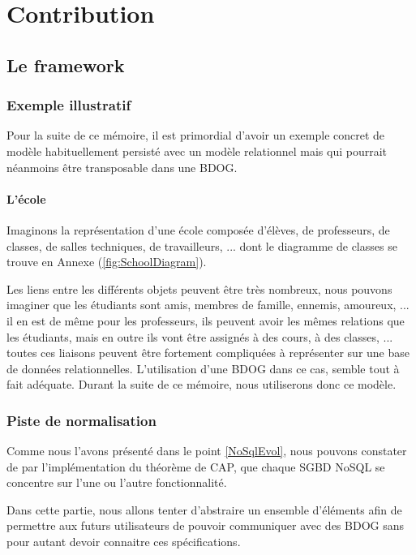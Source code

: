 \documentclass[a4paper,fleqn,12pt,oneside]{report}
\begin{document}
\part{Contribution}
\chapter{Le framework}
\section{Exemple illustratif}

Pour la suite de ce mémoire, il est primordial d'avoir un exemple concret de modèle habituellement persisté avec un modèle relationnel mais qui pourrait néanmoins être transposable dans une BDOG.

\subsection*{L'école}

Imaginons la représentation d'une école composée d'élèves, de professeurs, de classes, de salles techniques, de travailleurs, ... dont   le diagramme de classes se trouve en Annexe (\ref{fig:SchoolDiagram}).

Les liens entre les différents objets peuvent être très nombreux, nous pouvons imaginer que les étudiants sont amis, membres de famille, ennemis, amoureux, ... il en est de même pour les professeurs, ils peuvent avoir les mêmes relations que les étudiants, mais en outre ils vont être assignés à des cours, à des classes, ... toutes ces liaisons peuvent être fortement compliquées à représenter sur une base de données relationnelles. L’utilisation d’une BDOG dans ce cas, semble tout à fait adéquate. Durant la suite de ce mémoire, nous utiliserons donc ce modèle.



\section{Piste de normalisation} 
Comme nous l'avons présenté dans le point \ref{NoSqlEvol}, nous pouvons constater de par l'implémentation du théorème de CAP, que chaque SGBD NoSQL se concentre sur l'une ou l'autre fonctionnalité. 

Dans cette partie, nous allons tenter d'abstraire un ensemble d'éléments afin de permettre aux futurs utilisateurs de pouvoir communiquer avec des BDOG sans pour autant devoir connaitre ces spécifications. 
\end{document}
